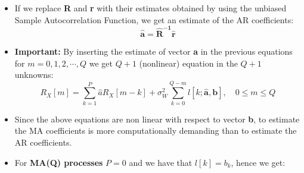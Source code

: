\begin{itemize}
\begin{align*}
&R_X[m] = \sum_{k=1}^{P} a_k R_X[m-k] \qquad \text{for } m = Q+1, Q+2, \dots, Q+P \\[10pt]
&\begin{bmatrix}
R_X[Q]      & R_X[Q-1]      & \cdots & R_X[Q-(P-1)] \\
R_X[Q+1]    & R_X[Q]        & \cdots & R_X[Q-(P-2)] \\
\vdots      & \vdots        & \ddots & \vdots       \\
R_X[Q+(P-1)]& R_X[Q+(P-2)]  & \cdots & R_X[Q]
\end{bmatrix}
\begin{bmatrix}
a_1 \\ a_2 \\ \vdots \\ a_P
\end{bmatrix}
=
\begin{bmatrix}
R_X[Q+1] \\ R_X[Q+2] \\ \vdots \\ R_X[Q+P]
\end{bmatrix}
\\[10pt]
&\mathbf{R}\,\mathbf{a} = \mathbf{r}
\;\;\Rightarrow\;\;
\mathbf{a} = \mathbf{R}^{-1}\mathbf{r}
\end{align*}

\item If we replace \textbf{R} and \textbf{r} with their estimates obtained by using the unbiased Sample Autocorrelation Function, we get an estimate of the AR coefficients:
\[
\mathbf{\hat{a}=\hat{R}^{-1}\hat{r}}
\]
\item \textbf{Important:} By inserting the estimate of vector \textbf{a} in the previous equations for \(m=0,1,2,\cdots,Q\) we get \(Q+1\) (nonlinear) equation in the \(Q+1\) unknowns:
\[
R_X[m]=\sum_{k=1}^{P}\hat{a}R_X[m-k]+\sigma^2_W\sum_{k=0}^{Q-m}l[k;\mathbf{\hat{a},b}],\quad 0\leq m\leq Q
\]
\item Since the above equations are non linear with respect to vector \textbf{b}, to estimate the MA coefficients is more computationally demanding than to estimate the AR coefficients.
\item For \textbf{MA(Q) processes} \(P=0\) and we have that \(l[k]=b_k\), hence we get:


\end{itemize}
